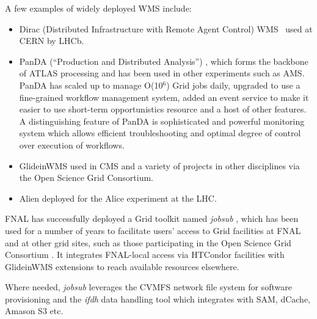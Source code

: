 \noindent
A few examples of widely deployed WMS include:
\begin{itemize}

\item Dirac (Distributed Infrastructure with Remote Agent Control) WMS~\cite{dirac_wms} used at CERN by LHCb.

\item PanDA (``Production and Distributed Analysis'') \cite{panda_chep13}, which forms the backbone of ATLAS processing and has been used in other experiments such as AMS.
PanDA has scaled up to manage O(10$^6$) Grid jobs daily, upgraded to use a fine-grained workflow management system, added an event service to
make it easier to use short-term opportunistics resource and a host of other features. A distinguishing feature of PanDA is sophisticated and powerful
monitoring system which allows efficient troubleshooting and optimal degree of control over execution of workflows.

\item GlideinWMS \cite{glideinwms_chep13} used in CMS and a variety of projects in other disciplines via the Open Science Grid Consortium.

\item Alien \cite{alien} deployed for the Alice experiment at the LHC.

\end{itemize}

\noindent
FNAL has successfully deployed a Grid toolkit named \textit{jobsub} \cite{jobsub_chep13}, which has been used for a number of years to facilitate users' access to
Grid facilities at FNAL and at other grid sites, such as those participating in the Open Science Grid Consortium \cite{osg}. It integrates FNAL-local access via
HTCondor facilities with GlideinWMS extensions to reach available resources elsewhere.

Where needed, \textit{jobsub} leverages the CVMFS network file system for software provisioning and the \textit{ifdh} data handling tool which integrates
with SAM, dCache, Amason S3 etc.



